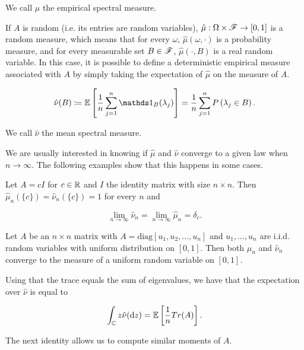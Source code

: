 We call $\hat\mu$ the empirical spectral measure. 

If $A$ is random (i.e. its entries are random variables), $\hat\mu:\Omega \times \mathscr F \to [0,1]$ is a random measure, which means that for every $\omega$, $\hat\mu(\omega, \cdot)$ is a probability measure, and for every measurable set $B\in\mathscr F$, $\hat\mu(\cdot,B)$ is a real random variable. In this case, it is possible to define a deterministic empirical measure associated with $A$ by simply taking the expectation of $\hat\mu$ on the measure of $A$.

\begin{equation*}
    \hat\nu(B) \coloneqq \E{ \frac1n \sum_{j=1}^n \mathds 1_B(\lambda_j) } = \frac1n \sum_{j=1}^n \P{\lambda_j \in B}.
\end{equation*}

We call $\hat\nu$ the mean spectral measure. 

We are usually interested in knowing if $\hat\mu$ and $\hat \nu$ converge to a given law when $n\to\infty$. The following examples show that this happens in some cases.

\begin{example} %
Let $A= c I$ for $c \in \mathbb R$ and $I$ the identity matrix with size $n\times n$. Then $\hat{\mu}_n(\{c\}) = \hat{\nu}_n(\{c\}) = 1$ for every $n$ and 

\begin{equation*}
    \lim_{n\to\infty} \hat{\nu}_n = \lim_{n\to\infty} \hat{\mu}_n = \delta_c.
\end{equation*}
\end{example}

\begin{example}
    Let $A$ be an $n \times n$ matrix with $A = \mathrm{diag}[u_1, u_2, \dots, u_n]$ and $u_1, \dots, u_n$ are i.i.d. random variables with uniform distribution on $[0,1]$. Then both $\hat \mu_n$ and $\hat \nu_n$ converge to the measure of a uniform random variable on $[0,1]$.
\end{example}

Using that the trace equals the sum of eigenvalues, we have that the expectation over  $\hat\nu$ is equal to

\begin{equation*}
    \int_\mathbb C z \hat\nu(\mathrm d z) = \mathbb E \left[  \frac1n Tr(A)  \right].
\end{equation*}

The next identity allows us to compute similar moments of $A$.

